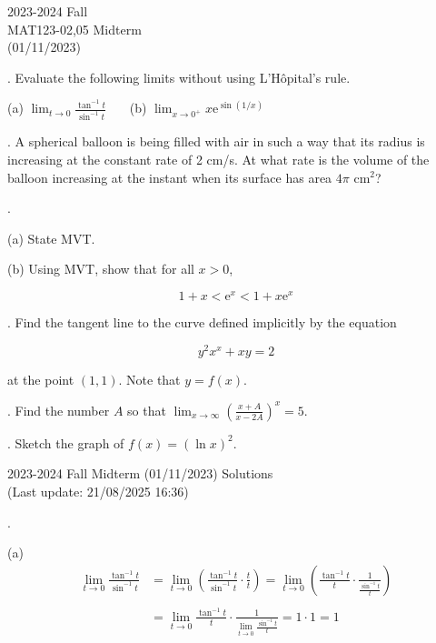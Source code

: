 \documentclass{article}
\begin{document}
\pagestyle{empty}
\large

\begin{center}
2023-2024 Fall \\MAT123-02,05 Midterm\\(01/11/2023)
\end{center}

. Evaluate the following limits without using L'Hôpital's rule.

\hfill

(a) $\displaystyle \lim_{t\to 0} \frac{\tan^{-1} t}{\sin^{-1} t}$ \ \ \ (b) $\displaystyle \lim_{x\to 0^+} x\mathrm{e}^{\displaystyle \sin(1/x)}$

\hfill

. A spherical balloon is being filled with air in such a way that its radius is increasing at the constant rate of 2 cm/s. At what rate is the volume of the balloon increasing at the instant when its surface has area $4\pi$ cm$^2$?

\hfill

.

\hfill

\noindent (a) State MVT.

\hfill

\noindent (b) Using MVT, show that for all $x>0$,

\[1+x<\mathrm{e}^x<1+x\mathrm{e}^x\]

\hfill

. Find the tangent line to the curve defined implicitly by the equation

\[y^2x^x+xy=2\]

\hfill

\noindent at the point $(1,1)$. Note that $y=f(x)$.

\hfill

. Find the number $A$ so that $\displaystyle\lim_{x\to\infty}\left(\frac{x+A}{x-2A}\right)^{x}=5$.

\hfill

. Sketch the graph of $f(x)=(\ln x)^2$.

\newpage

\begin{center}
2023-2024 Fall Midterm (01/11/2023) Solutions\\
(Last update: 21/08/2025 16:36)
\end{center}

.

\hfill

\noindent (a)
\begin{align*}
\lim_{t\to 0} \frac{\tan^{-1} t}{\sin^{-1} t}&= \lim_{t\to 0}\left( \frac{\tan^{-1} t}{\sin^{-1}t} \cdot\frac tt\right) = \lim_{t\to 0}\left( \frac{\tan^{-1} t}{t} \cdot\frac1{\frac {\sin^{-1}t}t}\right)\\\\&=\lim_{t\to0}\frac{\tan^{-1}t}t\cdot\frac1{\displaystyle\lim_{t\to 0}\frac{\sin^{-1}t}t}=1\cdot1=\boxed1
\end{align*}
\end{document}
